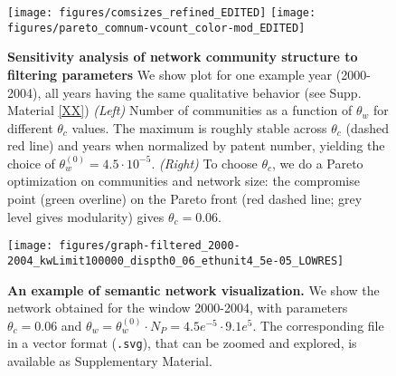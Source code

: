 \documentclass[10pt,A4]{article}
\begin{document}
\begin{figure}
\centering
\hspace{-2.5cm}
\texttt{[image: figures/comsizes\_refined\_EDITED]}
\texttt{[image: figures/pareto\_comnum-vcount\_color-mod\_EDITED]}
\caption{\textbf{Sensitivity analysis of network community structure to filtering parameters} We show plot for one example year (2000-2004), all years having the same qualitative behavior (see Supp. Material \ref{XX}) \textit{(Left)} Number of communities as a function of $\theta_w$ for different $\theta_c$ values. The maximum is roughly stable across $\theta_c$ (dashed red line) and years when normalized by patent number, yielding the choice of $\theta_w^{(0)} = 4.5\cdot 10^{-5}$. \textit{(Right)} To choose $\theta_c$, we do a Pareto optimization on communities and network size: the compromise point (green overline) on the Pareto front (red dashed line; grey level gives modularity) gives $\theta_c = 0.06$.}
\label{fig:networksensitivity}
\end{figure}

\begin{figure}
\centering
\hspace*{-7cm}
\texttt{[image: figures/graph-filtered\_2000-2004\_kwLimit100000\_dispth0\_06\_ethunit4\_5e-05\_LOWRES]}
\caption{\textbf{An example of semantic network visualization.} We show the network obtained for the window 2000-2004, with parameters $\theta_c = 0.06$ and $\theta_w = \theta_w^{(0)}\cdot N_P = 4.5e^{-5} \cdot 9.1e^{5}$. The corresponding file in a vector format (\texttt{.svg}), that can be zoomed and explored, is available as Supplementary Material.}
\label{fig:rawnetwork}
\end{figure}
\end{document}
